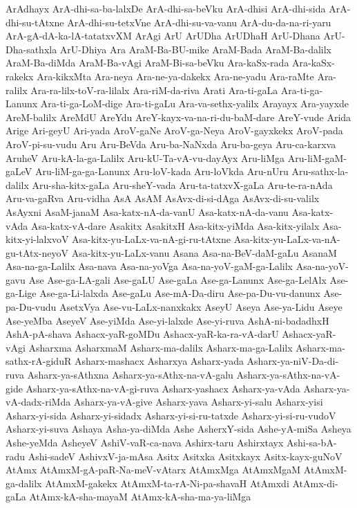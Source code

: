 {ArAdhayx
ArA-dhi-sa-ba-lalxDe
ArA-dhi-sa-beVku
ArA-dhisi
ArA-dhi-sida
ArA-dhi-su-tAtxne
ArA-dhi-su-tetxVne
ArA-dhi-su-va-vanu
ArA-du-da-na-ri-yaru
ArA-gA-dA-ka-lA-tatatxvXM
ArAgi
ArU
ArUDha
ArUDhaH
ArU-Dhana
ArU-Dha-sathxla
ArU-Dhiya
Ara
AraM-Ba-BU-mike
AraM-Bada
AraM-Ba-dalilx
AraM-Ba-diMda
AraM-Ba-vAgi
AraM-Bi-sa-beVku
Ara-kaSx-rada
Ara-kaSx-rakekx
Ara-kikxMta
Ara-neya
Ara-ne-ya-dakekx
Ara-ne-yadu
Ara-raMte
Ara-ralilx
Ara-ra-lilx-toV-ra-lilalx
Ara-riM-da-riva
Arati
Ara-ti-gaLa
Ara-ti-ga-Lanunx
Ara-ti-ga-LoM-dige
Ara-ti-gaLu
Ara-va-sethx-yalilx
Arayayx
Ara-yayxde
AreM-balilx
AreMdU
AreYdu
AreY-kayx-va-na-ri-du-baM-dare
AreY-vude
Arida
Arige
Ari-geyU
Ari-yada
AroV-gaNe
AroV-ga-Neya
AroV-gayxkekx
AroV-pada
AroV-pi-su-vudu
Aru
Aru-BeVda
Aru-ba-NaNxda
Aru-ba-geya
Aru-ca-karxva
AruheV
Aru-kA-la-ga-Lalilx
Aru-kU-Ta-vA-vu-dayAyx
Aru-liMga
Aru-liM-gaM-gaLeV
Aru-liM-ga-ga-Lanunx
Aru-loV-kada
Aru-loVkda
Aru-nUru
Aru-sathx-la-dalilx
Aru-sha-kitx-gaLa
Aru-sheY-vada
Aru-ta-tatxvX-gaLa
Aru-te-ra-nAda
Aru-va-gaRva
Aru-vidha
AsA
AsAM
AsAvx-di-si-dAga
AsAvx-di-su-valilx
AsAyxni
AsaM-janaM
Asa-katx-nA-da-vanU
Asa-katx-nA-da-vanu
Asa-katx-vAda
Asa-katx-vA-dare
Asakitx
AsakitxH
Asa-kitx-yiMda
Asa-kitx-yilalx
Asa-kitx-yi-lalxvoV
Asa-kitx-yu-LaLx-va-nA-gi-ru-tAtxne
Asa-kitx-yu-LaLx-va-nA-gu-tAtx-neyoV
Asa-kitx-yu-LaLx-vanu
Asana
Asa-na-BeV-daM-gaLu
AsanaM
Asa-na-ga-Lalilx
Asa-nava
Asa-na-yoVga
Asa-na-yoV-gaM-ga-Lalilx
Asa-na-yoV-gavu
Ase
Ase-ga-LA-gali
Ase-gaLU
Ase-gaLa
Ase-ga-Lanunx
Ase-ga-LelAlx
Ase-ga-Lige
Ase-ga-Li-lalxda
Ase-gaLu
Ase-mA-Da-diru
Ase-pa-Du-vu-danunx
Ase-pa-Du-vudu
AsetxVya
Ase-vu-LaLx-nanxkakx
AseyU
Aseya
Ase-ya-Lidu
Aseye
Ase-yeMba
AseyeV
Ase-yiMda
Ase-yi-lalxde
Ase-yi-ruva
AshA-ni-badadhxH
AshA-pA-shava
Ashacx-yaR-goMDu
Ashacx-yaR-ka-ra-vA-darU
Ashacx-yaR-vAgi
Asharxma
AsharxmaM
Asharx-ma-dalilx
Asharx-ma-ga-Lalilx
Asharx-ma-sathx-rA-giduR
Asharx-mashacx
Asharxya
Asharx-yada
Asharx-ya-niV-Da-di-ruva
Asharx-ya-sAthxna
Asharx-ya-sAthx-na-vA-galu
Asharx-ya-sAthx-na-vA-gide
Asharx-ya-sAthx-na-vA-gi-ruva
Asharx-yashacx
Asharx-ya-vAda
Asharx-ya-vA-dadx-riMda
Asharx-ya-vA-give
Asharx-yava
Asharx-yi-salu
Asharx-yisi
Asharx-yi-sida
Asharx-yi-sidadx
Asharx-yi-si-ru-tatxde
Asharx-yi-si-ru-vudoV
Asharx-yi-suva
Ashaya
Asha-ya-diMda
Ashe
AsherxY-sida
Ashe-yA-miSa
Asheya
Ashe-yeMda
AsheyeV
AshiV-vaR-ca-nava
Ashirx-taru
Ashirxtayx
Ashi-sa-bA-radu
Ashi-sadeV
AshivxV-ja-mAsa
Asitx
Asitxka
Asitxkayx
Asitx-kayx-guNoV
AtAmx
AtAmxM-gA-paR-Na-meV-vAtarx
AtAmxMga
AtAmxMgaM
AtAmxM-ga-dalilx
AtAmxM-gakekx
AtAmxM-ta-rA-Ni-pa-shavaH
AtAmxdi
AtAmx-di-gaLa
AtAmx-kA-sha-mayaM
AtAmx-kA-sha-ma-ya-liMga
}
